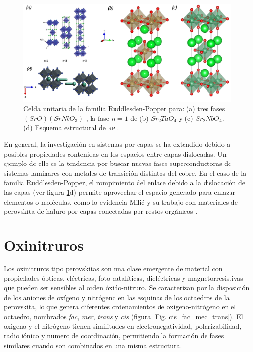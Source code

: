 \begin{figure}[H]
    \centering
    \includegraphics[width=13.0cm,keepaspectratio=true]{Figs/series-rp.png}
    \caption{Celda unitaria de la familia Ruddlesden-Popper para: (a) tres fases $(SrO) (SrNbO_{3})$ \cite{Fuertes2012ChemistryPerovskites}, la fase $n=1$ de (b) $Sr_{2}TaO_{4}$ y (c) $Sr_{2}NbO_{4}$. (d) Esquema estructural de \textsc{rp} \cite{milic2021Multi}.}
    \label{Fig. series-rp}
\end{figure}

En general, la investigación en sistemas por capas se ha extendido debido a posibles propiedades contenidas en los espacios entre capas dislocadas. Un ejemplo de ello es la tendencia por buscar nuevas fases superconductoras de sistemas laminares con metales de transición distintos del cobre\cite{Maeno1994SuperconductivityCopper}. En el caso de la familia Ruddlesden-Popper, el rompimiento del enlace debido a la dislocación de las capas (ver figura \ref{Fig. series-rp}d) permite aprovechar el espacio generado para enlazar elementos o moléculas, como lo evidencia Milić y su trabajo con materiales de perovskita de haluro por capas conectadas por restos orgánicos \cite{milic2021Multi}.  

\section{Oxinitruros}

Los oxinitruros tipo perovskitas son una clase emergente de material con propiedades ópticas, eléctricas, foto-catalíticas\cite{Pan2015Innentitelbild:10/2015}, dieléctricas y magnetorresistivas que pueden ser sensibles al orden óxido-nitruro. Se caracterizan por la disposición de los aniones de oxígeno y nitrógeno en las esquinas de los octaedros de la perovskita, lo que genera diferentes ordenamientos de oxígeno-nitrógeno en el octaedro, nombrados \emph{fac}, \emph{mer}, \emph{trans} y \emph{cis} (figura \ref{Fig. cis_fac_mec_trans}). El oxigeno y el nitrógeno tienen similitudes en electronegatividad, polarizabilidad, radio iónico y numero de coordinación, permitiendo la formación de fases similares cuando son combinados en una misma estructura\cite{Tobias2004,Yang2011}.

